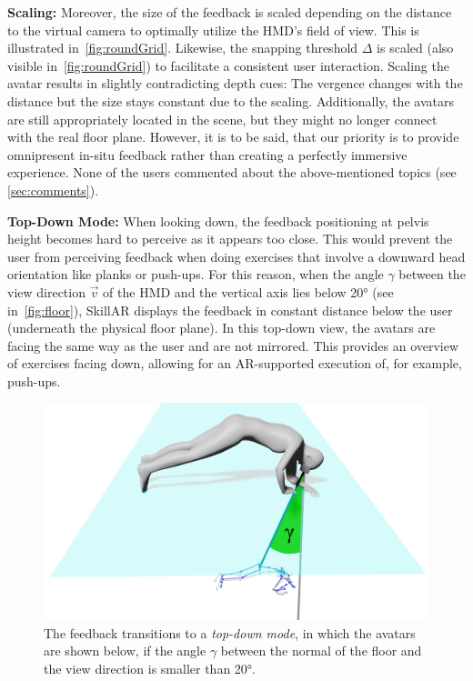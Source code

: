 \textbf{Scaling:}
Moreover, the size of the feedback is scaled depending on the distance to the virtual camera to optimally utilize the HMD's field of view.  This is illustrated in~\autoref{fig:roundGrid}. Likewise, the snapping threshold $\Delta$ is scaled (also visible in~\autoref{fig:roundGrid}) to facilitate a consistent user interaction. Scaling the avatar results in slightly contradicting depth cues: The vergence changes with the distance but the size stays constant due to the scaling. Additionally, the avatars are still appropriately located in the scene, but they might no longer connect with the real floor plane. However, it is to be said, that our priority is to provide omnipresent in-situ feedback rather than creating a perfectly immersive experience. None of the users commented about the above-mentioned topics (see \autoref{sec:comments}).

\textbf{Top-Down Mode:}
When looking down, the feedback positioning at pelvis height becomes hard to perceive as it appears too close. This would prevent the user from perceiving feedback when doing exercises that involve a downward head orientation like planks or push-ups. For this reason, when the angle $\gamma$ between the view direction $\vec{v}$ of the HMD and the vertical axis lies below 20° (see in~\autoref{fig:floor}), SkillAR displays the feedback in constant distance below the user (underneath the physical floor plane). In this top-down view, the avatars are facing the same way as the user and are not mirrored. This provides an overview of exercises facing down, allowing for an AR-supported execution of, for example, push-ups.

\begin{figure}[h!]
	\centering
	\includegraphics[width=0.6\linewidth]{pictures/floorPos.png}
	\caption{The feedback transitions to a \emph{top-down mode}, in which the avatars are shown below, if the angle $\gamma$ between the normal of the floor and the view direction is smaller than 20°. \label{fig:floor}}
\end{figure}

